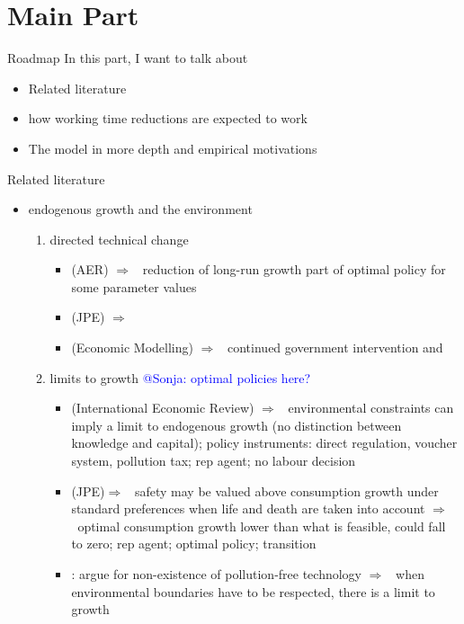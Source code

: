 \documentclass[11pt,aspectratio=169]{beamer}
\newcommand{\tr}[1]{\textcolor{blue}{#1}}
\newcommand{\ar}{$\Rightarrow$ \ }
\begin{document}
\section{Main Part}
\begin{frame}{Roadmap}
In this part, I want to talk about
\begin{itemize}
\item Related literature
\item how working time reductions are expected to work
\item The model in more depth and empirical motivations
\end{itemize}
\end{frame}

\begin{frame}[allowframebreaks]{Related literature}
\begin{itemize}
\item endogenous growth and the environment
\begin{enumerate}
\item  directed technical change
\begin{itemize}
	\item \cite{Acemoglu2012TheChange}(AER) \ar reduction of long-run growth part of optimal policy for some parameter values
	\item \cite{Acemoglu2016TransitionTechnology}(JPE) \ar 
	\item \cite{Eriksson2018PhasingChange}(Economic Modelling) \ar continued government intervention and 
\end{itemize}
\item  limits to growth \tr{@Sonja: optimal policies here?}
\begin{itemize}
	\item \cite{Stokey1998AreGrowth}(International Economic Review) \ar environmental constraints can imply a limit to endogenous growth (no distinction between knowledge and capital); policy instruments: direct regulation, voucher system, pollution tax; rep agent; no labour decision 
	\item \cite{Jones2016LifeGrowth}(JPE)\ar safety may be valued above consumption growth under standard preferences when life and death are taken into account \ar optimal consumption growth lower than what is feasible, could fall to zero; rep agent; optimal policy; transition
	\item \cite{Brock2005ChapterEmpirics}: argue for non-existence of pollution-free technology \ar  when environmental boundaries have to be respected, there is a limit to growth

\end{itemize}
\end{enumerate}
\end{itemize}
\end{frame}
\end{document}
